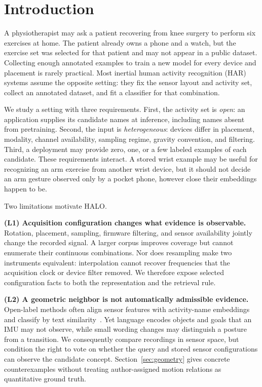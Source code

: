 \section{Introduction}

A physiotherapist may ask a patient recovering from knee surgery to perform six exercises at home.
The patient already owns a phone and a watch, but the exercise set was selected for that patient and
may not appear in a public dataset. Collecting enough annotated examples to train a new model for
every device and placement is rarely practical. Most inertial human activity recognition (HAR)
systems assume the opposite setting: they fix the sensor layout and activity set, collect an
annotated dataset, and fit a classifier for that combination.

We study a setting with three requirements. First, the activity set is \emph{open}: an application
supplies its candidate names at inference, including names absent from pretraining. Second, the
input is \emph{heterogeneous}: devices differ in placement, modality, channel availability,
sampling regime, gravity convention, and filtering. Third, a deployment may provide zero, one, or a
few labeled examples of each candidate. These requirements interact. A stored wrist example may be
useful for recognizing an arm exercise from another wrist device, but it should not decide an arm
gesture observed only by a pocket phone, however close their embeddings happen to be.

Two limitations motivate HALO.

\textbf{(L1) Acquisition configuration changes what evidence is observable.}
Rotation, placement, sampling, firmware filtering, and sensor availability jointly change the
recorded signal. A larger corpus improves coverage but cannot enumerate their continuous
combinations. Nor does resampling make two instruments equivalent: interpolation cannot recover
frequencies that the acquisition clock or device filter removed. We therefore expose selected
configuration facts to both the representation and the retrieval rule.

\textbf{(L2) A geometric neighbor is not automatically admissible evidence.}
Open-label methods often align sensor features with activity-name embeddings and classify by text
similarity~\cite{clip,lanhar,goat}. Yet language encodes objects and goals that an IMU may not
observe, while small wording changes may distinguish a posture from a transition. We consequently
compare recordings in sensor space, but condition the right to vote on whether the query and stored
sensor configurations can observe the candidate concept. Section~\ref{sec:geometry} gives concrete
counterexamples without treating author-assigned motion relations as quantitative ground truth.

